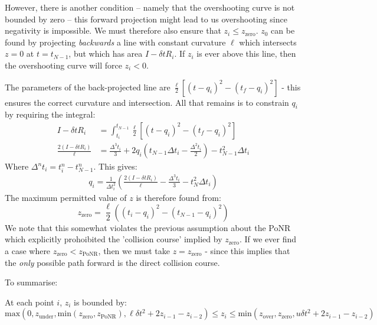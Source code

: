 \documentclass[]{article}
\begin{document}
					However, there is another condition -- namely that the overshooting curve is not bounded by zero -- this forward projection might lead to us overshooting since negativity is impossible. We must therefore also ensure that $z_i \leq z_\text{zero}$. $z_\text{0}$ can be found by projecting \textit{backwards} a line with constant curvature $\ell$ which intersects $z = 0$ at $t = t_{N-1}$, but which has area $I- \delta t R_i$. If $z_i$ is ever above this line, then the overshooting curve will force $z_i < 0$. 

					The parameters of the back-projected line are $\frac{\ell}{2}\left[(t - q_i)^2 - (t_f - q_i)^2 \right]$ - this ensures the correct curvature and intersection. All that remains is to constrain $q_i$ by requiring the integral:
					\begin{align}
						I - \delta t R_i & = \int_{t_i}^{t_{N-1}} \frac{\ell}{2}\left[(t - q_i)^2 - (t_f - q_i)^2 \right]
						\\
						\frac{2(I - \delta t R_i)}{\ell} & = \frac{\Delta^3 t_i}{3} + 2 q_i( t_{N-1} \Delta t_i - \frac{\Delta^2 t_i}{2}) - t_{N-1}^2 \Delta t_i
					\end{align}
					Where $\Delta^n t_i = t_i^n - t_{N-1}^n$. This gives:
					\begin{align}
						q_i = \frac{1}{\Delta t_i^2} \left( \frac{2(I - \delta t R_i)}{\ell} - \frac{\Delta^3 t_i}{3} - t_N^2 \Delta t_i\right)
					\end{align}
					The maximum permitted value of $z$ is therefore found from:
					\begin{equation}
						z_\text{zero} = \frac{\ell}{2} \left( (t_i - q_i)^2 - (t_{N-1} - q_i)^2\right)
					\end{equation}
					We note that this somewhat violates the previous assumption about the PoNR which explicitly prohoibited the 'collision course' implied by $z_\text{zero}$. If we ever find a case where $z_\text{zero} < z_\text{PoNR}$, then we must take $z = z_\text{zero}$ - since this implies that the \textit{only} possible path forward is the direct collision course. 

					To summarise:

					At each point $i$, $z_i$ is bounded by:
					\begin{equation}
						\text{max}(0,z_\text{under},\text{min}(z_\text{zero},z_\text{PoNR}),\ell \delta t^2 + 2 z_{i-1} - z_{i-2}) \leq z_i \leq \text{min}(z_\text{over},z_\text{zero},u \delta t^2 + 2 z_{i-1} - z_{i-2})
					\end{equation}
	\newpage
\end{document}
